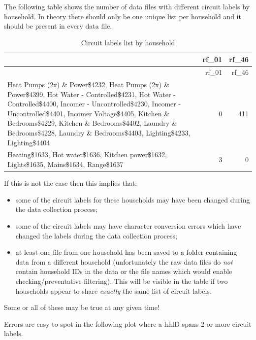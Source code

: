 \documentclass[]{article}
\providecommand{\tightlist}{%
  \setlength{\itemsep}{0pt}\setlength{\parskip}{0pt}}
\begin{document}
The following table shows the number of data files with different
circuit labels by household. In theory there should only be one unique
list per household and it should be present in every data file.

\begin{longtable}[]{@{}lrr@{}}
\caption{Circuit labels list by household}\tabularnewline
\toprule
& rf\_01 & rf\_46\tabularnewline
\midrule
\endfirsthead
\toprule
& rf\_01 & rf\_46\tabularnewline
\midrule
\endhead
Heat Pumps (2x) \& Power\$4232, Heat Pumps (2x) \& Power\$4399, Hot
Water - Controlled\$4231, Hot Water - Controlled\$4400, Incomer -
Uncontrolled\$4230, Incomer - Uncontrolled\$4401, Incomer Voltage\$4405,
Kitchen \& Bedrooms\$4229, Kitchen \& Bedrooms\$4402, Laundry \&
Bedrooms\$4228, Laundry \& Bedrooms\$4403, Lighting\$4233,
Lighting\$4404 & 0 & 411\tabularnewline
Heating\$1633, Hot water\$1636, Kitchen power\$1632, Lights\$1635,
Mains\$1634, Range\$1637 & 3 & 0\tabularnewline
\bottomrule
\end{longtable}

If this is not the case then this implies that:

\begin{itemize}
\tightlist
\item
  some of the circuit labels for these households may have been changed
  during the data collection process;
\item
  some of the circuit labels may have character conversion errors which
  have changed the labels during the data collection process;
\item
  at least one file from one household has been saved to a folder
  containing data from a different household (unfortunately the raw data
  files do \emph{not} contain household IDs in the data or the file
  names which would enable checking/preventative filtering). This will
  be visible in the table if two households appear to share
  \emph{exactly} the same list of circuit labels.
\end{itemize}

Some or all of these may be true at any given time!

Errors are easy to spot in the following plot where a hhID spans 2 or
more circuit labels.
\end{document}
